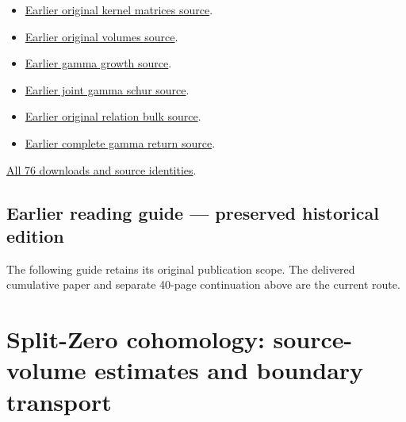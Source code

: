\documentclass[
]{article}
\begin{document}
\begin{itemize}
{  conductor kernel continuation source}.
\item
  \href{https://github.com/KokunoYumeto/zeta-function-research-reader/tree/5817ef9027257375b6ff3de7048b3331077251e7/workbenches/splitzero-tandem/continuations/20260914-original-kernel-matrices}{Earlier
  original kernel matrices source}.
\item
  \href{https://github.com/KokunoYumeto/zeta-function-research-reader/tree/1c8ec52c85c173adc9f8403a8a26914955e2f5a9/workbenches/splitzero-tandem/continuations/20260914-original-volumes}{Earlier
  original volumes source}.
\item
  \href{https://github.com/KokunoYumeto/zeta-function-research-reader/tree/41f020e0475429943252e69a1b4edd849393c780/workbenches/splitzero-tandem/continuations/20260914-gamma-growth}{Earlier
  gamma growth source}.
\item
  \href{https://github.com/KokunoYumeto/zeta-function-research-reader/tree/2be3b23974bf040f4ea06240b8a4b85372f7c71d/workbenches/splitzero-tandem/continuations/20260914-joint-gamma-schur}{Earlier
  joint gamma schur source}.
\item
  \href{https://github.com/KokunoYumeto/zeta-function-research-reader/tree/01fc8820e3a3ea69afa22b8ab1b0b5ca61869456/workbenches/splitzero-tandem/continuations/20260914-original-relation-bulk}{Earlier
  original relation bulk source}.
\item
  \href{https://github.com/KokunoYumeto/zeta-function-research-reader/tree/01fc8820e3a3ea69afa22b8ab1b0b5ca61869456/workbenches/splitzero-tandem/continuations/20260914-complete-gamma-return}{Earlier
  complete gamma return source}.
\end{itemize}

\href{calculation_edition_20260915_primitive_band/README.md}{All 76
downloads and source identities}.

\subsection{Earlier reading guide --- preserved historical
edition}\label{earlier-reading-guide-preserved-historical-edition}

The following guide retains its original publication scope. The
delivered cumulative paper and separate 40-page continuation above are
the current route.

\section{Split-Zero cohomology: source-volume estimates and boundary
transport}\label{split-zero-cohomology-source-volume-estimates-and-boundary-transport-1}
\end{document}
